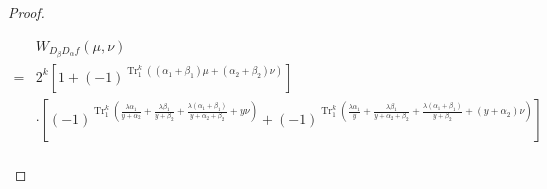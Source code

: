 \documentclass{article}
\newcommand{\0}{\textbf{0}}
\newcommand{\1}{\textbf{1}}
\newcommand{\TRACE}{\operatorname{Tr}_1^k}
\theoremstyle{plain}
\theoremstyle{nonumberplain}
\begin{document}
\begin{proof}
\begin{enumerate}[label=\textbf{Case \arabic*}]
\begin{enumerate}[label=\textbf{Case \Alph{*}},itemindent=*,wide=\parindent]
    \begin{align}\label{eq:simpleforms_4}
        &W_{D_{\beta}D_{\alpha}f}(\mu,\nu)\nonumber\\
        =&2^k\left[1+(-1)^{\TRACE\left((\alpha_1+\beta_1)\mu+ (\alpha_2+\beta_2)\nu\right)}\right]\nonumber\\
        &\cdot
        \left[(-1)^{\TRACE\left(\frac{\lambda\alpha_1}{y+\alpha_2}+\frac{\lambda\beta_1}{y+\beta_2}+\frac{\lambda(\alpha_1+\beta_1)}{y+\alpha_2+\beta_2}+ y\nu\right)}+
        (-1)^{\TRACE\left(\frac{\lambda\alpha_1}{y}+\frac{\lambda\beta_1}{y+\alpha_2+\beta_2}+\frac{\lambda(\alpha_1+\beta_1)}{y+\beta_2}+ (y+\alpha_2)\nu\right)}\right]\nonumber\\

\end{align}
\end{enumerate}
\end{enumerate}
\end{proof}
\end{document}
